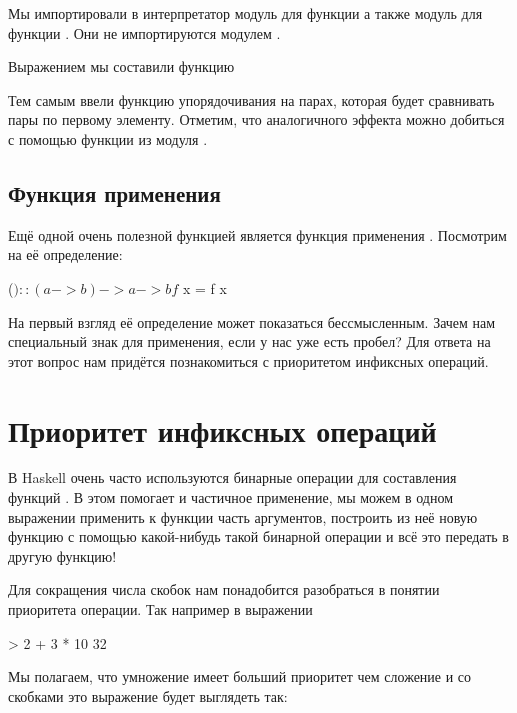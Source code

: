 Мы импортировали в интерпретатор модуль  для функции
 а также модуль  для функции .
Они не импортируются модулем .

Выражением  мы составили функцию 


Тем самым ввели функцию упорядочивания на парах, которая 
будет сравнивать пары по первому элементу.
Отметим, что аналогичного эффекта можно добиться
с помощью функции  из модуля .


\subsection{Функция применения}

Ещё одной очень полезной функцией является функция применения \In{($)}.
Посмотрим на её определение:

\begin{code}
($) :: (a -> b) -> a -> b
f $ x  =  f x
\end{code}

На первый взгляд её определение может показаться бессмысленным.
Зачем нам специальный знак для применения, если у нас уже есть
пробел? Для ответа на этот вопрос нам придётся 
познакомиться с приоритетом инфиксных операций.

\section{Приоритет инфиксных операций}

В Haskell очень часто используются 
бинарные операции для составления функций .
В этом помогает и частичное применение, мы можем в одном
выражении применить к функции часть аргументов, построить 
из неё новую функцию с помощью какой-нибудь такой бинарной
операции и всё это передать в другую функцию! 

Для сокращения числа скобок нам понадобится разобраться в
понятии приоритета операции. Так например в выражении 

\begin{code}
> 2 + 3 * 10
32
\end{code}

Мы полагаем, что умножение имеет больший приоритет чем
сложение и со скобками это выражение будет выглядеть так:

